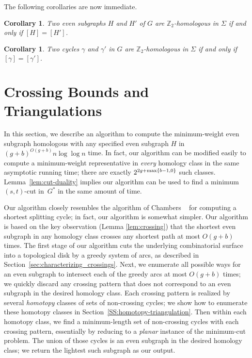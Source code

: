 \documentclass[11pt,twoside]{article}
\def\Z{\mathbb{Z}}
\let\cycle\gamma
\newtheorem{corollary}[theorem]{Corollary}
\begin{document}
The following corollaries are now immediate.

\begin{corollary}
Two even subgraphs $H$ and $H'$ of $G$ are $\Z_2$-homologous in $\Sigma$ if and only if $[H] = [H']$.
\end{corollary}

\begin{corollary}
Two cycles $\cycle$ and $\cycle'$ in $G$ are $\Z_2$-homologous in $\Sigma$ if and only if $[\cycle] = [\cycle']$.
\end{corollary}

\section{Crossing Bounds and Triangulations}
\label{sec:crossing}


In this section, we describe an
algorithm to compute the minimum-weight even subgraph homologous with any specified even subgraph 
$H$ in $(g+b)^{O(g+b)}n\log \log n$ time.  In fact, our algorithm can be
modified easily to compute a minimum-weight representative in
\emph{every} homology class in the same asymptotic running time;
there are exactly $2^{2g+\max\{ b-1,0 \}}$ such classes.
Lemma~\ref{lem:cut-duality} implies our algorithm can be used to find a minimum $(s,t)$-cut in~$G^*$ in the same amount of time.

Our algorithm closely resembles the algorithm of Chambers \etal~\cite{ccelw-scsih-08} for computing a shortest splitting cycle; in fact, our algorithm is somewhat simpler.  Our algorithm is based on the key observation (Lemma \ref{lem:crossing})  that the shortest even subgraph in any homology class crosses any shortest path at most $O(g+b)$ times.  The first stage of our algorithm cuts the underlying combinatorial surface into a topological disk by a greedy system of arcs, as described in Section~\ref{sec:characterizing_crossings}.  Next, we enumerate all possible ways for an even subgraph to intersect each of the greedy arcs at most $O(g+b)$ times; we quickly discard any crossing pattern that does not correspond to an even subgraph in the desired homology class.  Each crossing pattern is realized by several \emph{homotopy} classes of sets of non-crossing cycles; we show how to enumerate these homotopy classes in Section~\ref{SS:homotopy-triangulation}.  Then within each homotopy class, we find a minimum-length set of non-crossing cycles with each crossing pattern, essentially by reducing to a \emph{planar} instance of the minimum-cut problem.  The union of those cycles is an even subgraph in the desired homology class; we return the lightest such subgraph as our output.
\end{document}
